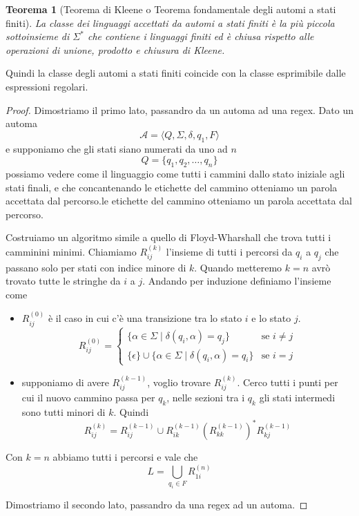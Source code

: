 \documentclass[12pt]{article}
\newtheorem{teorema}{Teorema}
\begin{document}
\begin{teorema}[Teorema di Kleene o Teorema fondamentale degli automi a stati finiti]
	La classe dei linguaggi accettati da automi a stati finiti è la più piccola sottoinsieme di $\Sigma^*$ che contiene i linguaggi finiti ed è chiusa rispetto alle operazioni di unione, prodotto e chiusura di Kleene.
\end{teorema}
Quindi la classe degli automi a stati finiti coincide con la classe esprimibile dalle espressioni regolari.
\begin{proof}
	Dimostriamo il primo lato, passandro da un automa ad una regex.
	Dato un automa
	$$ \mathcal{A} = \langle Q, \Sigma, \delta, q_1, F \rangle$$
	e supponiamo che gli stati siano numerati da uno ad $n$
	$$ Q = \{ q_1, q_2, \dots, q_n \} $$
	possiamo vedere come il linguaggio come tutti i cammini dallo stato iniziale agli stati finali, e che concantenando le etichette del cammino otteniamo un parola accettata dal percorso.le etichette del cammino otteniamo un parola accettata dal percorso.


	Costruiamo un algoritmo simile a quello di Floyd-Wharshall che trova tutti i camminini minimi.
	Chiamiamo $R_{ij}^{(k)}$ l'insieme di tutti i percorsi da $q_i$ a $q_j$ che passano solo per stati con indice minore di $k$.
	Quando metteremo $k = n$ avrò trovato tutte le stringhe da $i$ a $j$.
	Andando per induzione definiamo l'insieme come
	\begin{itemize}
		\item $R_{ij}^{(0)}$ è il caso in cui c'è una transizione tra lo stato $i$ e lo stato $j$.
			$$ R_{ij}^{(0)} = 
			\begin{cases}
				\{ \alpha \in \Sigma \mid \delta(q_i, \alpha) = q_j \} & \text{se } i \neq j \\
				\{\epsilon\} \cup \{ \alpha \in \Sigma \mid \delta(q_i, \alpha) = q_i \} & \text{se } i = j 
			\end{cases}
			$$
		\item supponiamo di avere $R_{ij}^{(k - 1)}$, voglio trovare $R_{ij}^{(k)}$.
			Cerco tutti i punti per cui il nuovo cammino passa per $q_k$, nelle sezioni tra i $q_k$ gli stati intermedi sono tutti minori di $k$.
			Quindi 
			$$ R_{ij}^{(k)} = R_{ij}^{(k - 1)} \cup R_{ik}^{(k - 1)} \left (R_{kk}^{(k - 1)}\right )^* R_{kj}^{(k - 1)} $$
	\end{itemize}
	Con $k = n$ abbiamo tutti i percorsi e vale che
	$$ L = \bigcup_{q_i \in F} R_{1i}^{(n)} $$

	Dimostriamo il secondo lato, passandro da una regex ad un automa.
\end{proof}
\end{document}
